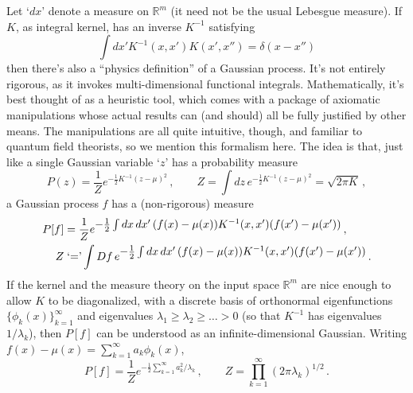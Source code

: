 \documentclass[11pt]{article}
\newcommand{\R}{\mathbb{R}}
\begin{document}
Let `$dx$' denote a measure on $\R^m$ (it need not be the usual Lebesgue measure). If $K$, as integral kernel, has an inverse $K^{-1}$ satisfying
%
\begin{equation} \int dx' K^{-1}(x,x') K(x',x'') = \delta(x-x'') \end{equation}
%
then there's also a ``physics definition'' of a Gaussian process. It's not entirely rigorous, as it invokes multi-dimensional functional integrals. Mathematically, it's best thought of as a heuristic tool, which comes with a package of axiomatic manipulations whose actual results can (and should) all be fully justified by other means. The manipulations are all quite intuitive, though, and familiar to quantum field theorists, so we mention this formalism here. The idea is that, just like a single Gaussian variable `$z$' has a probability measure
%
\begin{equation} P(z) = \frac{1}{Z}e^{-\frac{1}{2}K^{-1}(z-\mu)^2}\,,\qquad Z = \int dz\,e^{-\frac{1}{2}K^{-1}(z-\mu)^2} = \sqrt{2\pi K}\,, \end{equation}
%
a Gaussian process $f$ has a (non-rigorous) measure
%
\begin{align} P[f] &= \frac{1}{Z}e^{\textstyle-\frac{1}{2} \int dx\,dx'\, (f(x)-\mu(x)) K^{-1}(x,x')(f(x')-\mu(x'))}\,, \notag \\ 
Z &\; \text{`='} \int Df\, e^{\textstyle-\frac{1}{2} \int dx\,dx'\, (f(x)-\mu(x)) K^{-1}(x,x')(f(x')-\mu(x'))}\,. \end{align}
%
If the kernel and the measure theory on the input space $\R^m$ are nice enough to allow $K$ to be diagonalized, with a discrete basis of orthonormal eigenfunctions $\{\phi_k(x)\}_{k=1}^\infty$ and eigenvalues $\lambda_1\geq \lambda_2\geq\ldots > 0$ (so that $K^{-1}$ has eigenvalues $1/\lambda_k$), then $P[f]$ can be understood as an infinite-dimensional Gaussian. Writing $f(x)-\mu(x) = \sum_{k=1}^\infty a_k \phi_k(x)$,
%
\begin{equation} P[f] = \frac{1}{Z} e^{\textstyle -\frac{1}{2}\sum_{k=1}^\infty a_k^2/\lambda_k}\,,\qquad Z = \prod_{k=1}^\infty (2\pi \lambda_k)^{1/2}\,.\end{equation}
\end{document}
